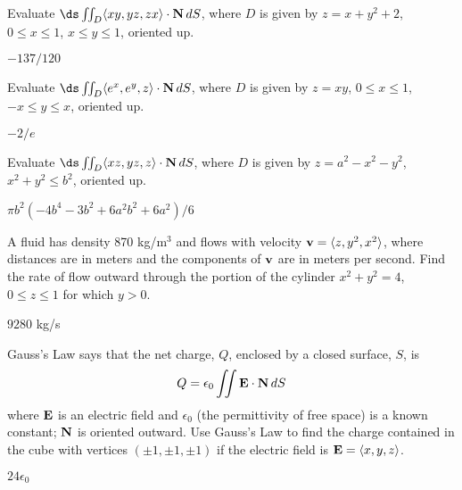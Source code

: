 \begin{enumialphparenastyle}
\begin{ex}
Evaluate $\ds \iint_{D} \langle xy, yz,zx\rangle\cdot {\bf
  N}\,dS$, where $D$ is given by $z=x+y^2+2$, $0\le x\le 1$, $x\le
y\le 1$, oriented up.
\begin{sol}
	$-137/120$
\end{sol}
\end{ex}

\begin{ex}
Evaluate $\ds \iint_{D} \langle e^x, e^y,z\rangle\cdot {\bf
  N}\,dS$, where $D$ is given by $z=xy$, $0\le x\le 1$, $-x\le
y\le x$, oriented up.
\begin{sol}
	$-2/e$
\end{sol}
\end{ex}

\begin{ex}
Evaluate $\ds \iint_{D} \langle xz,yz,z\rangle\cdot {\bf
N}\,dS$, where $D$ is given by $z=a^2-x^2-y^2$, $x^2+y^2\le b^2$, 
oriented up.
\begin{sol}
	$\pi b^2(-4b^4-3b^2+6a^2b^2+6a^2)/6$
\end{sol}
\end{ex}

\begin{ex}
A fluid has density 870 kg/m$^3$ and flows with velocity ${\bf v} =
 \langle z,y^2,x^2\rangle$, where distances are in meters and the
 components of ${\bf v}$ are in meters per second.  Find the rate of flow
 outward through the portion of the cylinder $x^2+y^2 = 4$, $0\leq
 z\leq 1$ for which $y>0$.
\begin{sol}
	$9280$ kg/s
\end{sol}
\end{ex}

\begin{ex}
Gauss's Law says that the net charge, $Q$,
enclosed by a closed surface, $S$, is 
$$Q=\epsilon_0 \iint {\bf E}\cdot {\bf N}\,dS$$ 
where ${\bf E}$ is an electric field and $\epsilon_0$ (the
permittivity of free space) is a known constant; $\bf N$ is oriented
outward. 
Use Gauss's Law to find the charge contained in the cube with vertices
$(\pm 1, \pm 1, \pm 1)$ if the electric field is 
${\bf E} = \langle x,y,z\rangle$.
\begin{sol}
	$24\epsilon_0$
\end{sol}
\end{ex}

\end{enumialphparenastyle}